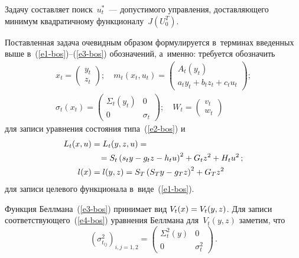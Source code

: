 \begin{multicols}{2}
     Задачу составляет поиск~$u_t^*$~--- допустимого управ\-ле\-ния, 
доставляющего минимум квад\-ра\-тич\-но\-му функционалу~$J(U_0^T)$.
      
     Поставленная задача очевидным образом формулируется в~терминах 
введенных выше в~(\ref{e1-bos})--(\ref{e3-bos}) обозначений, а~именно: 
     требуется обозначить
     \begin{gather*}
      x_t=\begin{pmatrix}
     y_t\\ z_t\end{pmatrix};\quad  m_t(x_t, u_t)=\begin{pmatrix}
     A_t(y_t)\\ a_t y_t +b_t z_t +c_t u_t\end{pmatrix};\\
     \sigma_t(x_t)= \begin{pmatrix}
     \Sigma_t(y_t)& 0\\
     0& \sigma_t\end{pmatrix};\quad W_t=\begin{pmatrix}
     v_t \\ w_t\end{pmatrix}
     \end{gather*}
для записи уравнения со\-сто\-яния типа~(\ref{e2-bos}) и
\begin{align*}
L_t(x,u)&= L_t(y,z,u) ={}\\
&\hspace*{3mm}{}=S_t\left( s_t y-g_t z -h_t u\right)^2 +G_t z^2 +H_t  u^2\,;\\
l(x)&= l(y,z) =S_T \left( S_T y-g_T z\right)^2 +G_T z^2
\end{align*}
для записи целевого функционала в~виде~(\ref{e1-bos}).

     Функция Беллмана~(\ref{e3-bos}) принимает вид 
     $V_t(x)\hm= V_t(y,z)$. Для записи со\-от\-вет\-ст\-ву\-юще\-го~(\ref{e4-bos}) 
уравнения Беллмана для~$V_t(y,z)$ заметим, что
     $$
     \left( \sigma^2_{t_{ij}}\right)_{i,j=1,2}= \begin{pmatrix}
     \Sigma_t^2(y) & 0\\
     0 & \sigma_t^2\end{pmatrix}\,.
     $$
     

\end{multicols}
